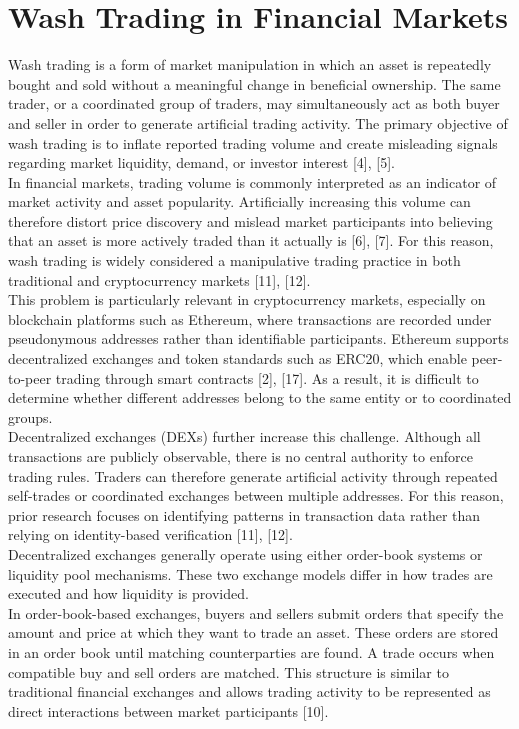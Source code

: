 \documentclass[language=english,thesis=bachelor,nosecondtitle,faculty=cb,onesided,12pt]{hsmw-thesis}
\begin{document}
	\section{Wash Trading in Financial Markets}
Wash trading is a form of market manipulation in which an asset is repeatedly bought and sold without a meaningful change in beneficial ownership. The same trader, or a coordinated group of traders, may simultaneously act as both buyer and seller in order to generate artificial trading activity. The primary objective of wash trading is to inflate reported trading volume and create misleading signals regarding market liquidity, demand, or investor interest [4], [5].\\
In financial markets, trading volume is commonly interpreted as an indicator of market activity and asset popularity. Artificially increasing this volume can therefore distort price discovery and mislead market participants into believing that an asset is more actively traded than it actually is [6], [7]. For this reason, wash trading is widely considered a manipulative trading practice in both traditional and cryptocurrency markets [11], [12].\\
This problem is particularly relevant in cryptocurrency markets, especially on blockchain platforms such as Ethereum, where transactions are recorded under pseudonymous addresses rather than identifiable participants. Ethereum supports decentralized exchanges and token standards such as ERC20, which enable peer-to-peer trading through smart contracts [2], [17]. As a result, it is difficult to determine whether different addresses belong to the same entity or to coordinated groups.\\
Decentralized exchanges (DEXs) further increase this challenge. Although all transactions are publicly observable, there is no central authority to enforce trading rules. Traders can therefore generate artificial activity through repeated self-trades or coordinated exchanges between multiple addresses. For this reason, prior research focuses on identifying patterns in transaction data rather than relying on identity-based verification [11], [12].\\
Decentralized exchanges generally operate using either order-book systems or liquidity pool mechanisms. These two exchange models differ in how trades are executed and how liquidity is provided.\\
In order-book-based exchanges, buyers and sellers submit orders that specify the amount and price at which they want to trade an asset. These orders are stored in an order book until matching counterparties are found. A trade occurs when compatible buy and sell orders are matched. This structure is similar to traditional financial exchanges and allows trading activity to be represented as direct interactions between market participants [10].\\
\end{document}

